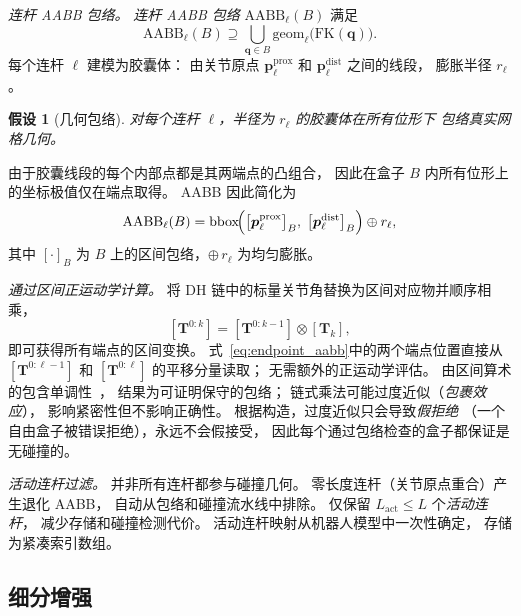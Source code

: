\documentclass[journal]{IEEEtran}
\newtheorem{assumption}{假设}
\newcommand{\AABB}{\text{AABB}}
\newcommand{\FK}{\text{FK}}
\newcommand{\bT}{\mathbf{T}}
\begin{document}
\emph{连杆 AABB 包络。}
\emph{连杆 AABB 包络} $\AABB_\ell(B)$ 满足
\begin{equation}\label{eq:envelope}
  \AABB_\ell(B) \supseteq \bigcup_{\bm{q} \in B}
    \mathrm{geom}_\ell\bigl(\FK(\bm{q})\bigr).
\end{equation}
每个连杆 $\ell$ 建模为胶囊体：
由关节原点 $\bm{p}_\ell^{\mathrm{prox}}$
和 $\bm{p}_\ell^{\mathrm{dist}}$ 之间的线段，
膨胀半径 $r_\ell$。

\begin{assumption}[几何包络]\label{asm:geom}
对每个连杆 $\ell$，半径为 $r_\ell$ 的胶囊体在所有位形下
包络真实网格几何。
\end{assumption}

由于胶囊线段的每个内部点都是其两端点的凸组合，
因此在盒子 $B$ 内所有位形上的坐标极值仅在端点取得。
AABB 因此简化为
\begin{equation}\label{eq:endpoint_aabb}
  \AABB_\ell(B)
  = \mathrm{bbox}\!\Bigl(
      \bigl[\bm{p}_\ell^{\mathrm{prox}}\bigr]_B,\;
      \bigl[\bm{p}_\ell^{\mathrm{dist}}\bigr]_B
    \Bigr) \oplus r_\ell,
\end{equation}
其中 $[\cdot]_B$ 为 $B$ 上的区间包络，$\oplus\,r_\ell$ 为均匀膨胀。

\emph{通过区间正运动学计算。}
将 DH 链中的标量关节角替换为区间对应物并顺序相乘，
\begin{equation}\label{eq:chain}
  [\bT^{0:k}] = [\bT^{0:k-1}] \otimes [\bT_k],
\end{equation}
即可获得所有端点的区间变换。
式~\eqref{eq:endpoint_aabb}中的两个端点位置直接从
$[\bT^{0:\ell-1}]$ 和 $[\bT^{0:\ell}]$ 的平移分量读取；
无需额外的正运动学评估。
由区间算术的包含单调性~\cite{moore2009introduction}，
结果为可证明保守的包络；
链式乘法可能过度近似（\emph{包裹效应}），
影响紧密性但不影响正确性。
根据构造，过度近似只会导致\emph{假拒绝}
（一个自由盒子被错误拒绝），永远不会假接受，
因此每个通过包络检查的盒子都保证是无碰撞的。

\emph{活动连杆过滤。}
并非所有连杆都参与碰撞几何。
零长度连杆（关节原点重合）产生退化 AABB，
自动从包络和碰撞流水线中排除。
仅保留 $L_\text{act} \leq L$ 个\emph{活动连杆}，
减少存储和碰撞检测代价。
活动连杆映射从机器人模型中一次性确定，
存储为紧凑索引数组。

\subsection{细分增强}\label{sec:subdivision}
\end{document}
